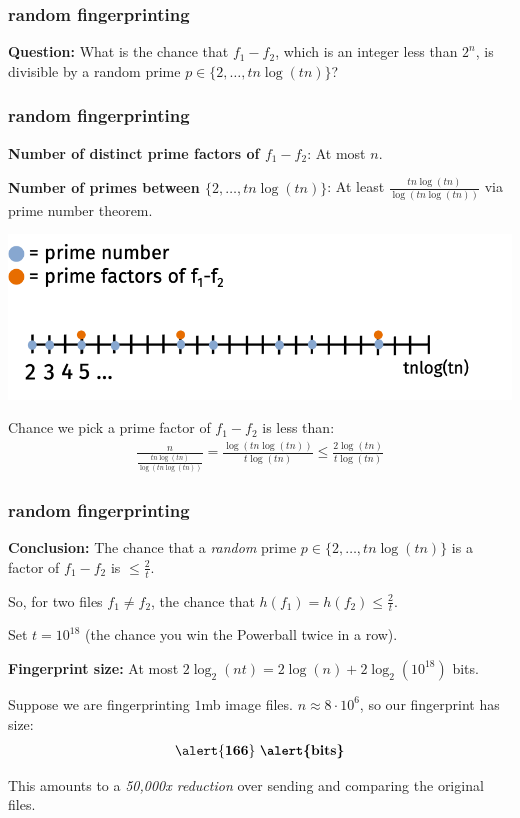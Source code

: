 \documentclass[compress]{beamer}
\begin{document}
\begin{frame}[t]
	\frametitle{random fingerprinting}
	\textbf{Question:} What is the chance that $f_1 - f_2$, which is an integer less than $2^n$, is divisible by a random prime $p\in \{2, \ldots, tn\log(tn)\}$?
	
\end{frame}

\begin{frame}[t]
	\frametitle{random fingerprinting}
	\textbf{Number of distinct prime factors of $f_1 - f_2$}: At most $n$.
	\vspace{1em}
	
	\textbf{Number of primes between $\{2, \ldots, tn\log(tn)\}$}: At least $\frac{tn\log(tn)}{\log(tn\log(tn))}$ via prime number theorem.
	
	\vspace{-1em}
	\begin{center}
		\includegraphics[width=\textwidth]{number_line.png}
	\end{center}
	\vspace{-1em}
Chance we pick a prime factor of $f_1 - f_2$ is less than:
	\begin{align*}
		\frac{n}{\frac{tn\log(tn)}{\log(tn\log(tn))}} =  \frac{\log(tn\log(tn))}{t\log(tn)} \leq \frac{2\log(tn)}{t\log(tn)}
	\end{align*}	
	
\end{frame}


\begin{frame}[t]
	\frametitle{random fingerprinting}
	\textbf{Conclusion:} The chance that a \emph{random} prime $p\in \{2, \ldots, tn\log(tn)\}$ is a factor of $f_1 - f_2$ is $\leq \frac{2}{t}$.
	
	So, for two files $f_1 \neq f_2$, the chance that $h(f_1) = h(f_2) \leq \frac{2}{t}$.
	\vspace{2em}
	
	Set $t = 10^{18}$ (the chance you win the Powerball twice in a row).
	
	\textbf{Fingerprint size:} At most $2\log_2(nt) = 2\log(n) + 2\log_2(10^{18})$ bits. 
	
	Suppose we are fingerprinting $1$mb image files. $n \approx 8\cdot 10^6$, so our fingerprint has size:
	\begin{align*}
		\alert{\mathbf{166}}\text{ \textbf{\alert{bits}}}
	\end{align*}
	
	This amounts to a \emph{50,000x reduction} over sending and comparing the original files.
\end{frame}
\end{document}
